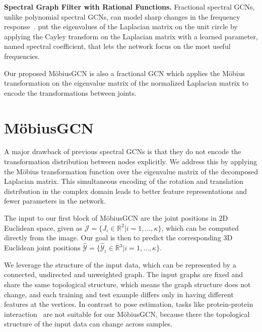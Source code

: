 \documentclass[runningheads]{llncs}
\begin{document}
\textbf{Spectral Graph Filter with Rational Functions.} Fractional spectral GCNs, unlike polynomial spectral GCNs, can model sharp changes in the frequency response~\cite{bianchi2021graph}.
\citet{levie2017cayleynets} put the eigenvalues of the Laplacian matrix on the unit circle by applying the Cayley transform on the Laplacian matrix with a learned parameter, named spectral coefficient, that lets the network focus on the most useful frequencies.

Our proposed M\"obiusGCN is also a fractional GCN which applies the M\"obius transformation on the eigenvalue matrix of the normalized Laplacian matrix to encode the transformations between joints.

\section{M\"{o}biusGCN}
A major drawback of previous spectral GCNs is that they do not encode the transformation distribution between nodes explicitly. We address this by applying the M\"obius transformation function over the eigenvalue matrix of the decomposed Laplacian matrix. This simultaneous encoding of the rotation and translation distribution in the complex domain leads to better feature representations and fewer parameters in the network.

The input to our first block of M\"obiusGCN are the joint positions in 2D Euclidean space, given as $\mathcal{J} = \{J_i \in \mathbb{R} ^2| i = 1, \dots, \kappa\}$, which can be computed directly from the image. Our goal is then to predict the corresponding 3D Euclidean joint positions $\hat{\mathcal{Y}} = \{\hat{\mathcal{Y}}_i \in \mathbb{R}^3| i = 1, \dots, \kappa\}$.

We leverage the structure of the input data, which can be represented by a connected, undirected and unweighted graph.
The input graphs are fixed and share the same topological structure, which means the graph structure does not change, and each training and test example differs only in having different features at the vertices. In contrast to pose estimation, tasks like protein-protein interaction~\cite{velivckovic2017graph} are not suitable for our M\"obiusGCN, because there the topological structure of the input data can change across samples.
\end{document}
